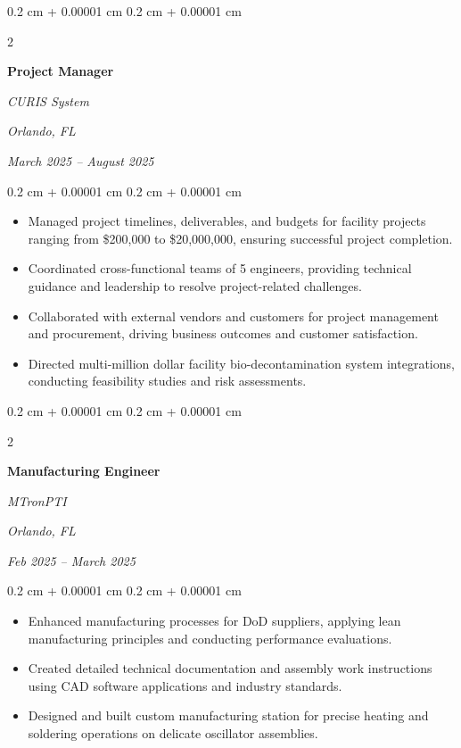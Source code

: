 \documentclass[10pt, letterpaper]{article}
\newenvironment{highlights}{
    \begin{itemize}[
        topsep=0.10 cm,
        parsep=0.10 cm,
        partopsep=0pt,
        itemsep=0pt,
        leftmargin=0.4 cm + 10pt
    ]
}{
    \end{itemize}
} %
\newenvironment{onecolentry}{
    \begin{adjustwidth}{
        0.2 cm + 0.00001 cm
    }{
        0.2 cm + 0.00001 cm
    }
}{
    \end{adjustwidth}
} %
\newenvironment{twocolentry}[2][]{
    \onecolentry
    \def\secondColumn{#2}
    \setcolumnwidth{\fill, 9.0 cm}
    \begin{paracol}{2}
}{
    \switchcolumn \raggedleft \secondColumn
    \end{paracol}
    \endonecolentry
} %
\begin{document}
        \vspace{0.35 cm}

        \begin{twocolentry}{
        \textit{Orlando, FL}    
            
        \textit{March 2025 – August 2025}}
            \textbf{Project Manager}
            
            \textit{CURIS System}
        \end{twocolentry}

        \vspace{0.10 cm}
        \begin{onecolentry}
            \begin{highlights}
                \item Managed project timelines, deliverables, and budgets for facility projects ranging from \$200,000 to \$20,000,000, ensuring successful project completion.
                \item Coordinated cross-functional teams of 5 engineers, providing technical guidance and leadership to resolve project-related challenges.
                \item Collaborated with external vendors and customers for project management and procurement, driving business outcomes and customer satisfaction.
                \item Directed multi-million dollar facility bio-decontamination system integrations, conducting feasibility studies and risk assessments.
            \end{highlights}
        \end{onecolentry}


        \vspace{0.35 cm}

        
        \begin{twocolentry}{
        \textit{Orlando, FL}    
            
        \textit{Feb 2025 – March 2025}}
            \textbf{Manufacturing Engineer}
            
            \textit{MTronPTI}
        \end{twocolentry}

        \vspace{0.10 cm}
        \begin{onecolentry}
            \begin{highlights}
                \item Enhanced manufacturing processes for DoD suppliers, applying lean manufacturing principles and conducting performance evaluations.
                \item Created detailed technical documentation and assembly work instructions using CAD software applications and industry standards.
                \item Designed and built custom manufacturing station for precise heating and soldering operations on delicate oscillator assemblies.
            \end{highlights}
        \end{onecolentry}
\end{document}
